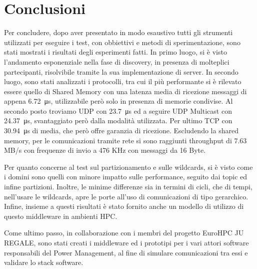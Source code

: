 \chapter{Conclusioni}
Per concludere, dopo aver presentato in modo esaustivo tutti gli strumenti utilizzati per eseguire i test, con obbiettivi e metodi di sperimentazione, sono stati mostrati i risultati degli esperimenti fatti. 
In primo luogo, si è visto l'andamento esponenziale nella fase di discovery, in presenza di molteplici partecipanti, risolvibile tramite la sua implementazione di server.
In secondo luogo, sono stati analizzati i protocolli, tra cui il più performante si è rilevato essere quello di Shared Memory con una latenza media di ricezione messaggi di appena \SI{6.72}{\micro\second}, utilizzabile però solo in presenza di memorie condivise. Al secondo posto troviamo UDP con \SI{23.7}{\micro\second} ed a seguire UDP Multicast con \SI{24.37}{\micro\second}, svantaggiato però dalla modalità utilizzata. Per ultimo TCP con \SI{30.94}{\micro\second} di media, che però offre garanzia di ricezione. Escludendo la shared memory, per le comunicazioni tramite rete si sono raggiunti throughput di 7.63 MB/s con frequenze di invio a 476 KHz con messaggi da 16 Byte.

Per quanto concerne al test sul partizionamento e sulle wildcards, si è visto come i domini sono quelli con minore impatto sulle performance, seguito dai topic ed infine partizioni. Inoltre, le minime differenze sia in termini di cicli, che di tempi, nell'usare le wildcards, apre le porte all'uso di comunicazioni di tipo gerarchico.
Infine, insieme a questi risultati è stato fornito anche un modello di utilizzo di questo middleware in ambienti HPC.

Come ultimo passo, in collaborazione con i membri del progetto EuroHPC JU REGALE, sono stati creati i middleware ed i prototipi per i vari attori software responsabili del Power Management, al fine di simulare comunicazioni tra essi e validare lo stack software. 

